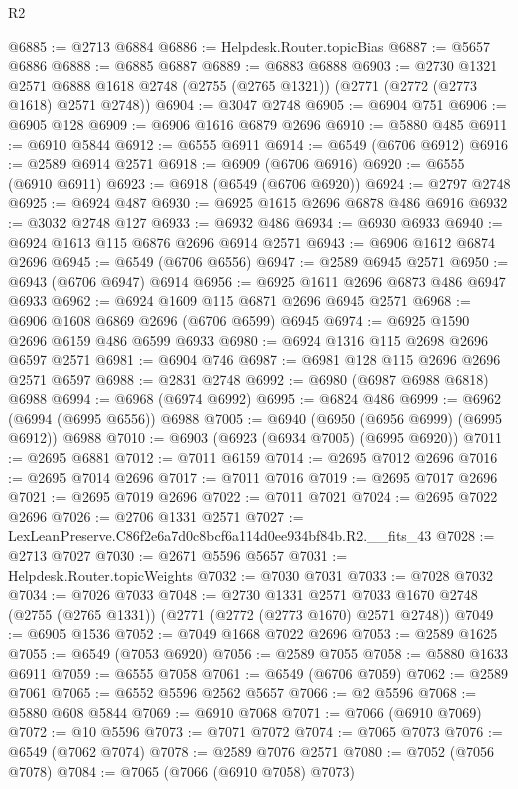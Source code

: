 \begin{lexlean}{R2}
\begin{coremodule}
@6885 := @2713 @6884
@6886 := Helpdesk.Router.topicBias
@6887 := @5657 @6886
@6888 := @6885 @6887
@6889 := @6883 @6888
@6903 := @2730
    @1321
    @2571
    @6888
    @1618
    @2748
    (@2755 (@2765 @1321))
    (@2771 (@2772 (@2773 @1618) @2571 @2748))
@6904 := @3047 @2748
@6905 := @6904 @751
@6906 := @6905 @128
@6909 := @6906 @1616 @6879 @2696
@6910 := @5880 @485
@6911 := @6910 @5844
@6912 := @6555 @6911
@6914 := @6549 (@6706 @6912)
@6916 := @2589 @6914 @2571
@6918 := @6909 (@6706 @6916)
@6920 := @6555 (@6910 @6911)
@6923 := @6918 (@6549 (@6706 @6920))
@6924 := @2797 @2748
@6925 := @6924 @487
@6930 := @6925 @1615 @2696 @6878 @486 @6916
@6932 := @3032 @2748 @127
@6933 := @6932 @486
@6934 := @6930 @6933
@6940 := @6924 @1613 @115 @6876 @2696 @6914 @2571
@6943 := @6906 @1612 @6874 @2696
@6945 := @6549 (@6706 @6556)
@6947 := @2589 @6945 @2571
@6950 := @6943 (@6706 @6947) @6914
@6956 := @6925 @1611 @2696 @6873 @486 @6947 @6933
@6962 := @6924 @1609 @115 @6871 @2696 @6945 @2571
@6968 := @6906 @1608 @6869 @2696 (@6706 @6599) @6945
@6974 := @6925 @1590 @2696 @6159 @486 @6599 @6933
@6980 := @6924 @1316 @115 @2698 @2696 @6597 @2571
@6981 := @6904 @746
@6987 := @6981 @128 @115 @2696 @2696 @2571 @6597
@6988 := @2831 @2748
@6992 := @6980 (@6987 @6988 @6818) @6988
@6994 := @6968 (@6974 @6992)
@6995 := @6824 @486
@6999 := @6962 (@6994 (@6995 @6556)) @6988
@7005 := @6940 (@6950 (@6956 @6999) (@6995 @6912)) @6988
@7010 := @6903 (@6923 (@6934 @7005) (@6995 @6920))
@7011 := @2695 @6881
@7012 := @7011 @6159
@7014 := @2695 @7012 @2696
@7016 := @2695 @7014 @2696
@7017 := @7011 @7016
@7019 := @2695 @7017 @2696
@7021 := @2695 @7019 @2696
@7022 := @7011 @7021
@7024 := @2695 @7022 @2696
@7026 := @2706 @1331 @2571
@7027 := LexLeanPreserve.C86f2e6a7d0c8bcf6a114d0ee934bf84b.R2.__fits_43
@7028 := @2713 @7027
@7030 := @2671 @5596 @5657
@7031 := Helpdesk.Router.topicWeights
@7032 := @7030 @7031
@7033 := @7028 @7032
@7034 := @7026 @7033
@7048 := @2730
    @1331
    @2571
    @7033
    @1670
    @2748
    (@2755 (@2765 @1331))
    (@2771 (@2772 (@2773 @1670) @2571 @2748))
@7049 := @6905 @1536
@7052 := @7049 @1668 @7022 @2696
@7053 := @2589 @1625
@7055 := @6549 (@7053 @6920)
@7056 := @2589 @7055
@7058 := @5880 @1633 @6911
@7059 := @6555 @7058
@7061 := @6549 (@6706 @7059)
@7062 := @2589 @7061
@7065 := @6552 @5596 @2562 @5657
@7066 := @2 @5596
@7068 := @5880 @608 @5844
@7069 := @6910 @7068
@7071 := @7066 (@6910 @7069)
@7072 := @10 @5596
@7073 := @7071 @7072
@7074 := @7065 @7073
@7076 := @6549 (@7062 @7074)
@7078 := @2589 @7076 @2571
@7080 := @7052 (@7056 @7078)
@7084 := @7065 (@7066 (@6910 @7058) @7073)

\end{coremodule}
\end{lexlean}
